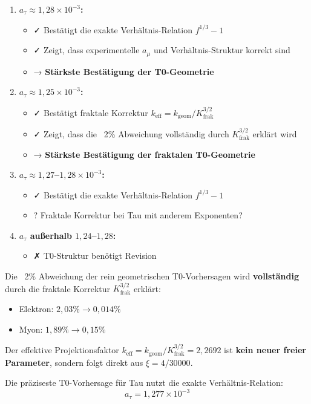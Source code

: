 	\begin{enumerate}
		\item \textbf{$a_\tau \approx 1{,}28 \times 10^{-3}$:}
		\begin{itemize}
			\item ✓ Bestätigt die exakte Verhältnis-Relation $f^{1/3} - 1$
			\item ✓ Zeigt, dass experimentelle $a_\mu$ und Verhältnis-Struktur korrekt sind
			\item → \textbf{Stärkste Bestätigung der T0-Geometrie}
		\end{itemize}
		
		\item \textbf{$a_\tau \approx 1{,}25 \times 10^{-3}$:}
		\begin{itemize}
			\item ✓ Bestätigt fraktale Korrektur $k_{\text{eff}} = k_\text{geom}/K_\text{frak}^{3/2}$
			\item ✓ Zeigt, dass die ~2\% Abweichung vollständig durch $K_\text{frak}^{3/2}$ erklärt wird
			\item → \textbf{Stärkste Bestätigung der fraktalen T0-Geometrie}
		\end{itemize}
		
		\item \textbf{$a_\tau \approx 1{,}27$--$1{,}28 \times 10^{-3}$:}
		\begin{itemize}
			\item ✓ Bestätigt die exakte Verhältnis-Relation $f^{1/3} - 1$
			\item ? Fraktale Korrektur bei Tau mit anderem Exponenten?
		\end{itemize}
		
		\item \textbf{$a_\tau$ außerhalb $1{,}24$--$1{,}28$:}
		\begin{itemize}
			\item ✗ T0-Struktur benötigt Revision
		\end{itemize}
	\end{enumerate}
	
	\begin{keypoint}[Kernaussage]
		Die ~2\% Abweichung der rein geometrischen T0-Vorhersagen wird \textbf{vollständig} durch die fraktale Korrektur $K_\text{frak}^{3/2}$ erklärt:
		\begin{itemize}
			\item Elektron: $2{,}03\% \to 0{,}014\%$
			\item Myon: $1{,}89\% \to 0{,}15\%$
		\end{itemize}
		
		Der effektive Projektionsfaktor $k_\text{eff} = k_\text{geom}/K_\text{frak}^{3/2} = 2{,}2692$ ist \textbf{kein neuer freier Parameter}, sondern folgt direkt aus $\xi = 4/30000$.
		
		Die präziseste T0-Vorhersage für Tau nutzt die exakte Verhältnis-Relation:
		\begin{equation}
			\boxed{a_\tau = 1{,}277 \times 10^{-3}}
		\end{equation}
	\end{keypoint}	
